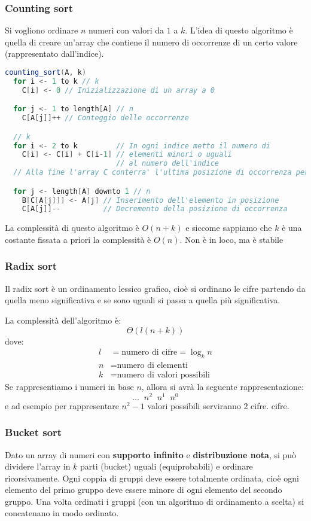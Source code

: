 \documentclass[a4paper]{article}
\begin{document}
\subsubsection{Counting sort}
Si vogliono ordinare \( n \) numeri con valori da \( 1 \) a \( k \). L'idea di questo
algoritmo è quella di creare un'array che contiene il numero di occorrenze di un
certo valore (rappresentato dall'indice).

\begin{lstlisting}[language=Scala]
counting_sort(A, k) 
  for i <- 1 to k // k
    C[i] <- 0 // Inizializzazione di un array a 0

  for j <- 1 to length[A] // n
    C[A[j]]++ // Conteggio delle occorrenze

  // k
  for i <- 2 to k         // In ogni indice metto il numero di
    C[i] <- C[i] + C[i-1] // elementi minori o uguali
                          // al numero dell'indice
  // Alla fine l'array C conterra' l'ultima posizione di occorrenza per ogni elemento

  for j <- length[A] downto 1 // n
    B[C[A[j]]] <- A[j] // Inserimento dell'elemento in posizione
    C[A[j]]--          // Decremento della posizione di occorrenza
\end{lstlisting}
La complessità di questo algoritmo è \( O(n + k) \) e siccome sappiamo che \( k \) è
una costante fissata a priori la complessità è \( O(n) \). Non è in loco, ma è stabile

\subsubsection{Radix sort}
Il radix sort è un ordinamento lessico grafico, cioè si ordinano le cifre partendo da
quella meno significativa e se sono uguali si passa a quella più significativa.

La complessità dell'algoritmo è:
\[
 \Theta(l(n + k))
\] 
dove:
\[
\begin{aligned}
  l & = \text{numero di cifre} = \log_k n\\
  n & = \text{numero di elementi}\\
  k & = \text{numero di valori possibili}
\end{aligned}
\] 
Se rappresentiamo i numeri in base \( n \), allora si avrà la seguente rappresentazione:
\[
   \ldots \;\; n^2 \;\; n^1 \;\; n^0
\] 
e ad esempio per rappresentare \( n^2 - 1 \) valori possibili serviranno \( 2 \) cifre.
cifre.

\subsubsection{Bucket sort}
Dato un array di numeri con \textbf{supporto infinito} e \textbf{distribuzione nota}, si può dividere
l'array in \( k \) parti (bucket) uguali (equiprobabili) e ordinare ricorsivamente. Ogni coppia
di gruppi deve essere totalmente ordinata, cioè ogni elemento del primo gruppo deve essere
minore di ogni elemento del secondo gruppo. Una volta ordinati i gruppi (con un algoritmo
di ordinamento a scelta) si concatenano in modo ordinato.
\end{document}
